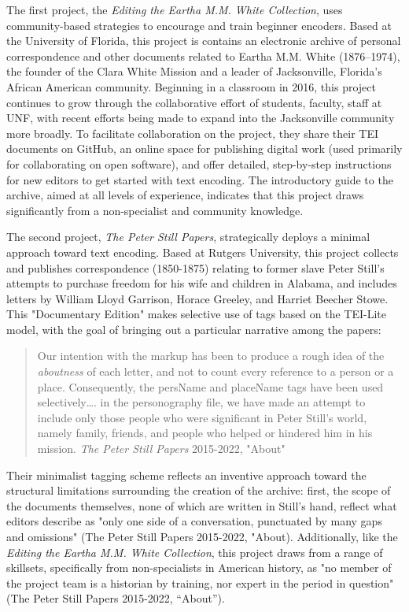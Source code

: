 \documentclass[11pt]{article}
\begin{document}
The first project, the \emph{Editing the Eartha M.M. White Collection},
uses community-based strategies to encourage and train beginner
encoders. Based at the University of Florida, this project is contains
an electronic archive of personal correspondence and other documents
related to Eartha M.M. White (1876–1974), the founder of the Clara
White Mission and a leader of Jacksonville, Florida's African American
community. Beginning in a classroom in 2016, this project continues to
grow through the collaborative effort of students, faculty, staff at
UNF, with recent efforts being made to expand into the Jacksonville
community more broadly. To facilitate collaboration on the project,
they share their TEI documents on GitHub, an online space for
publishing digital work (used primarily for collaborating on open
software), and offer detailed, step-by-step instructions for new
editors to get started with text encoding. The introductory guide to
the archive, aimed at all levels of experience, indicates that this
project draws significantly from a non-specialist and community
knowledge.

The second project, \emph{The Peter Still Papers}, strategically deploys a
minimal approach toward text encoding. Based at Rutgers University,
this project collects and publishes correspondence (1850-1875)
relating to former slave Peter Still’s attempts to purchase freedom
for his wife and children in Alabama, and includes letters by William
Lloyd Garrison, Horace Greeley, and Harriet Beecher Stowe. This
"Documentary Edition" makes selective use of tags based on the
TEI-Lite model, with the goal of bringing out a particular narrative
among the papers:
\begin{quote}
Our intention with the markup has been to produce a rough idea of the
\emph{aboutness} of each letter, and not to count every reference to a
person or a place. Consequently, the persName and placeName tags have
been used selectively\ldots{}. in the personography file, we have made an
attempt to include only those people who were significant in Peter
Still’s world, namely family, friends, and people who helped or
hindered him in his mission. \emph{The Peter Still Papers} 2015-2022, "About"
\end{quote}
Their minimalist tagging scheme reflects an inventive approach toward
the structural limitations surrounding the creation of the archive:
first, the scope of the documents themselves, none of which are
written in Still’s hand, reflect what editors describe as "only one
side of a conversation, punctuated by many gaps and omissions" (The
Peter Still Papers 2015-2022, "About). Additionally, like the \emph{Editing
the Eartha M.M. White Collection}, this project draws from a range of
skillsets, specifically from non-specialists in American history, as
"no member of the project team is a historian by training, nor expert
in the period in question" (The Peter Still Papers 2015-2022,
“About”).
\end{document}
